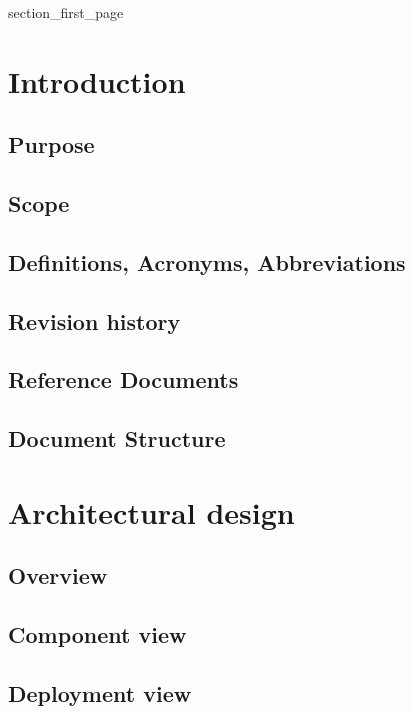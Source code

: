 \documentclass[a4paper]{article}
\begin{document}
{section_first_page}

\newpage
{}

\tableofcontents

\newpage
{}

\section{Introduction}

\subsection{Purpose}
\subsection{Scope}
\subsection{Definitions, Acronyms, Abbreviations}
\subsection{Revision history}
\subsection{Reference Documents}
\subsection{Document Structure}

\newpage
\section{Architectural design}

\subsection{Overview}
\subsection{Component view}
\subsection{Deployment view}
\end{document}
